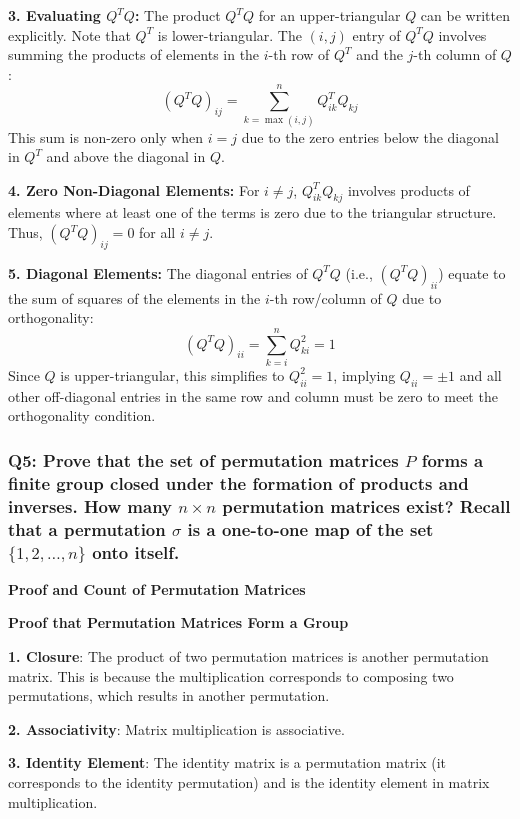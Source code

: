 \documentclass[8pt]{article}
\begin{document}
\textbf{3. Evaluating \( Q^TQ \):}
   The product \( Q^TQ \) for an upper-triangular \( Q \) can be written explicitly. Note that \( Q^T \) is lower-triangular. The \( (i, j) \) entry of \( Q^TQ \) involves summing the products of elements in the \( i \)-th row of \( Q^T \) and the \( j \)-th column of \( Q \):
   \[
   (Q^TQ)_{ij} = \sum_{k=\max(i,j)}^n Q^T_{ik}Q_{kj}
   \]
   This sum is non-zero only when \( i = j \) due to the zero entries below the diagonal in \( Q^T \) and above the diagonal in \( Q \).

\textbf{4. Zero Non-Diagonal Elements:}
   For \( i \neq j \), \( Q^T_{ik}Q_{kj} \) involves products of elements where at least one of the terms is zero due to the triangular structure. Thus, \( (Q^TQ)_{ij} = 0 \) for all \( i \neq j \).

\textbf{5. Diagonal Elements:}
   The diagonal entries of \( Q^TQ \) (i.e., \( (Q^TQ)_{ii} \)) equate to the sum of squares of the elements in the \( i \)-th row/column of \( Q \) due to orthogonality:
   \[
   (Q^TQ)_{ii} = \sum_{k=i}^n Q_{ki}^2 = 1
   \]
   Since \( Q \) is upper-triangular, this simplifies to \( Q_{ii}^2 = 1 \), implying \( Q_{ii} = \pm 1 \) and all other off-diagonal entries in the same row and column must be zero to meet the orthogonality condition.


\subsubsection*{Q5: Prove that the set of permutation matrices \(P\) forms a finite group closed under the formation of products and inverses. How many \(n \times n\) permutation matrices exist? Recall that a permutation \(\sigma\) is a one-to-one map of the set \(\{1, 2, \ldots, n\}\) onto itself.}

\textbf{Proof and Count of Permutation Matrices}

\textbf{Proof that Permutation Matrices Form a Group}

\textbf{1. Closure}: The product of two permutation matrices is another permutation matrix. This is because the multiplication corresponds to composing two permutations, which results in another permutation.

\textbf{2. Associativity}: Matrix multiplication is associative.

\textbf{3. Identity Element}: The identity matrix is a permutation matrix (it corresponds to the identity permutation) and is the identity element in matrix multiplication.
\end{document}
